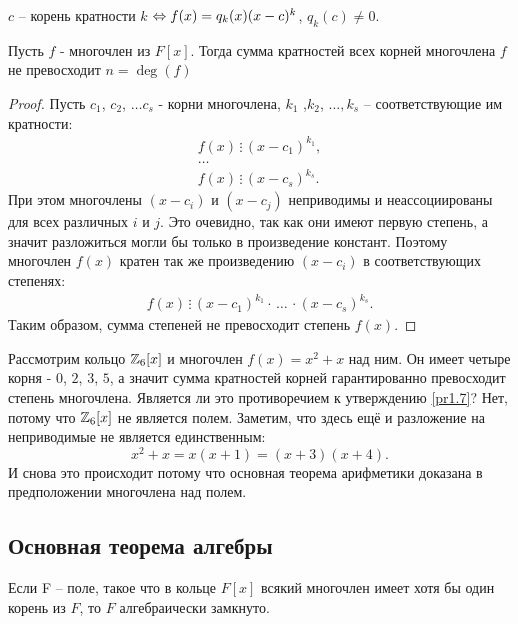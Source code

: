 \begin{note}
    $c$ -- корень кратности $k$ $\Leftrightarrow f(x) = q_k(x) (x-c)^k$, $q_k(c) \neq 0$.
\end{note}

\begin{proposition}
    \label{pr1.7}
    Пусть $f$ - многочлен из $F[x]$. Тогда сумма кратностей всех корней многочлена $f$ не превосходит $n = \deg(f)$
\end{proposition}

\begin{proof}
    Пусть $c_1$, $c_2$, $\dots c_s$ - корни многочлена, $k_1$ ,$k_2$, $\dots ,k_s$ -- соответствующие им 
    кратности: 
    \begin{gather*}
        f(x) \, \vdots \, (x - c_1)^{k_1}, \\
        \dots \\
        f(x) \, \vdots \, (x - c_s)^{k_s}.
    \end{gather*}
    При этом многочлены $(x-c_i)$ и $(x-c_j)$ неприводимы и неассоциированы для всех различных $i$ и $j$. 
    Это очевидно, так как они имеют первую степень, а значит разложиться могли бы только в произведение констант. 
    Поэтому многочлен $f(x)$ кратен так же произведению $(x-c_i)$ в соответствующих степенях:
    \begin{gather*}
        f(x) \, \vdots \, (x-c_1)^{k_1} \cdot \, \dots \, \cdot (x-c_s)^{k_s}.
    \end{gather*}
    Таким образом, сумма степеней не превосходит степень $f(x)$.
\end{proof}

\begin{note}
    Рассмотрим кольцо $\mathbb{Z}_6[x]$ и многочлен $f(x) = x^2 + x$ над ним. Он имеет четыре корня - $0$, $2$, $3$, $5$, 
    а значит сумма кратностей корней гарантированно превосходит степень многочлена. 
    Является ли это противоречием к утверждению \ref{pr1.7}? Нет, потому что $\mathbb{Z}_6[x]$ не является полем.
    Заметим, что здесь ещё и разложение на неприводимые не является единственным: 
    $$x^2 + x = x(x+1) = (x+3)(x+4).$$
    И снова это происходит потому что основная теорема арифметики доказана в предположении многочлена над полем.
\end{note}

\subsection{Основная теорема алгебры}

\begin{definition}
    Если F -- поле, такое что в кольце $F[x]$ всякий многочлен имеет хотя бы один корень из $F$, то 
    $F$ алгебраически замкнуто.
\end{definition}

